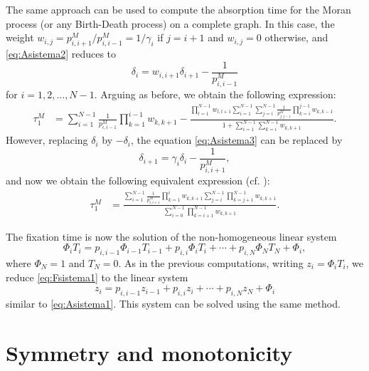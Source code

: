 \documentclass[a4paper,english,10pt]{amsart}
\theoremstyle{definition}
\numberwithin{equation}{section}
\begin{document}
The same approach can be used to compute the absorption time for the Moran process (or any Birth-Death process) on a complete graph. In this case, the weight 
$w_{i,j} = p^M_{i,i+1}/p^M_{i,i-1} =  1/\gamma_i$ 
if $j = i+1$ and $w_{i,j}=0$ otherwise, 
and \eqref{eq:Asistema2} reduces to
 \begin{equation}
  \label{eq:Asistema3}
  \delta_i = w_{i,i+1} \delta_{i+1} - \frac{1}{p^M_{i,i-1}}
\end{equation}
for $i = 1,2, \dots , N-1$. Arguing as before, we obtain the following expression:
\begin{align} \label{eq:ATBD1}
  \tau^M_1  & = \sum_{i=1}^{N-1} \frac{1}{p^M_{i,i-1}} 
\prod_{k=1}^{i-1} w_{k,k+1}  -  \frac{\displaystyle \prod_{l=1}^{N-1} w_{l,l+1} \sum_{i=1}^{N-1}  \sum_{j=i}^{N-1} \frac{1}{p^M_{j,j-1}} \prod_{k=i}^{j-1} w_{k,k-1}}{\displaystyle 1 +  \sum_{i=1}^{N-1}  \sum_{k=i}^{N-1} w_{k,k+1}}. 
\end{align}
However, replacing $\delta_i$ by $-\delta_i$, the equation \eqref{eq:Asistema3} can be replaced by 
 \begin{equation}
  \label{eq:Asistema4}
  \delta_{i+1} = \gamma_i \delta_i - \frac{1}{p^M_{i,i+1}}, 
\end{equation}
and now we obtain the following equivalent expression (cf. \cite[Section 4.7]{KT}): 
\begin{align} \label{eq:ATBD2}
  \tau^M_1 &  = \frac{\displaystyle \sum_{i=1}^{N-1}  \frac{1}{p^M_{i,i+1}}\prod_{k=1}^{i} w_{k,k+1} \sum_{j=i}^{N-1}  \prod_{k=j+1}^{N-1} w_{k,k+1}}{\displaystyle \sum_{i=0}^{N-1} \prod_{k=i+1}^{N-1} w_{k,k+1}}.
\end{align}

 The fixation time is now the solution of the non-homogeneous linear system
\begin{equation}
  \label{eq:Fsistema1}
	\Phi_i T_i = p_{i,i-1} \Phi_{i-1} T_{i-1}+ p_{i,i} \Phi_i  T_i+ 
    \cdots + p_{i,N} \Phi_N T_N+ \Phi_i,
\end{equation}
where $\Phi_N = 1$ and $T_N = 0$. As in the previous computations, writing 
$z_i = \Phi_i  T_i$, we reduce \eqref{eq:Fsistema1} to the linear system 
\begin{equation}
  \label{eq:Fsistema2}
	z_i = p_{i,i-1} z_{i-1} + p_{i,i} z_i + 
    \cdots + p_{i,N} z_N + \Phi_i
\end{equation}
similar to \eqref{eq:Asistema1}. This system can be solved using the same method. 

\section{Symmetry and monotonicity}
\label{Smonotone}
\end{document}
